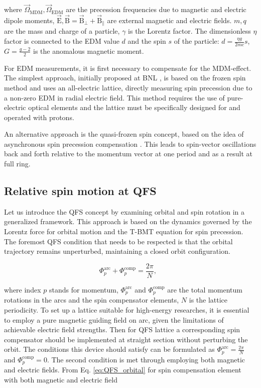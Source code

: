 \documentclass[submitting]{nst}
\begin{document}
\noindent where $\vec{\Omega}_{\text{MDM}}, \vec{\Omega}_{\text{EDM}}$ are the precession frequencies due to magnetic and electric dipole moments, $\vec{\mathrm{E}}, \vec{\mathrm{B}} = \vec{\mathrm{B}}_{\perp} + \vec{\mathrm{B}}_{\|}$ are external magnetic and electric fields. $m, q$ are the mass and charge of a particle, $\gamma$ is the Lorentz factor. The dimensionless $\eta$ factor is connected to the EDM value $d$ and the spin $s$ of the particle: $d = \frac{\eta g}{2mc}s$, $G=\frac{g-2}{2}$ is the anomalous magnetic moment. 

\par For EDM measurements, it is first necessary to compensate for the MDM-effect. The simplest approach, initially proposed at BNL \cite{BNL}, is based on the frozen spin method and uses an all-electric lattice, directly measuring spin precession due to a non-zero EDM in radial electric field. This method requires the use of pure-electric optical elements and the lattice must be specifically designed for and operated with protons.
\par An alternative approach is the quasi-frozen spin concept, based on the idea of asynchronous spin precession compensation \cite{QFS}. This leads to spin-vector oscillations back and forth relative to the momentum vector at one period and as a result at full ring.

\subsection{Relative spin motion at QFS}    

\par Let us introduce the QFS concept by examining orbital and spin rotation in a generalized framework. This approach is based on the dynamics governed by the Lorentz force for orbital motion and the T-BMT equation for spin precession. The foremost QFS condition that needs to be respected is that the orbital trajectory remains unperturbed, maintaining a closed orbit configuration.

\begin{equation}
	\Phi_p^{\textrm{arc}}+\Phi_{p}^{\textrm{comp}}=\frac{2\pi}{N},\ \ \
	\label{eq:QFS_orbital}
\end{equation}

\noindent where index $p$ stands for momentum, $\Phi_p^{\textrm{arc}}$ and $\Phi_{p}^{\textrm{comp}}$ are the total momentum rotations in the arcs and the spin compensator elements, $N$ is the lattice periodicity. To set up a lattice suitable for high-energy researches, it is essential to employ a pure magnetic guiding field on arc, given the limitations of achievable electric field strengths. Then for QFS lattice a corresponding spin compensator should be implemented at straight section without perturbing the orbit. The conditions this device should satisfy can be formulated as $\Phi_p^{\textrm{arc}} = \frac{2\pi}{N}$ and $\Phi_{p}^{\textrm{comp}} = 0$. The second condition is met through employing both magnetic and electric fields. From Eq. \ref{eq:QFS_orbital} for spin compensation element with both magnetic and electric field
\end{document}
